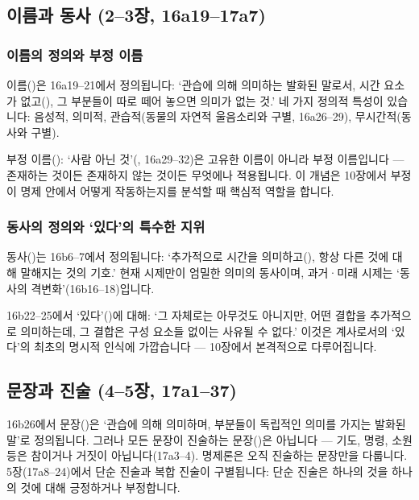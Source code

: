 \documentclass[12pt, a4paper]{article}
\begin{document}
\subsection{이름과 동사 (2--3장, 16a19--17a7)}

\subsubsection{이름의 정의와 부정 이름}

이름()은 16a19--21에서 정의됩니다: `관습에 의해 의미하는 발화된 말로서, 시간 요소가 없고(), 그 부분들이 따로 떼어 놓으면 의미가 없는 것.' 네 가지 정의적 특성이 있습니다: 음성적, 의미적, 관습적(동물의 자연적 울음소리와 구별, 16a26--29), 무시간적(동사와 구별).

부정 이름(): `사람 아닌 것'(, 16a29--32)은 고유한 이름이 아니라 부정 이름입니다 --- 존재하는 것이든 존재하지 않는 것이든 무엇에나 적용됩니다. 이 개념은 10장에서 부정이 명제 안에서 어떻게 작동하는지를 분석할 때 핵심적 역할을 합니다.

\subsubsection{동사의 정의와 `있다'의 특수한 지위}

동사()는 16b6--7에서 정의됩니다: `추가적으로 시간을 의미하고(), 항상 다른 것에 대해 말해지는 것의 기호.'
현재 시제만이 엄밀한 의미의 동사이며, 과거·미래 시제는 `동사의 격변화'(16b16--18)입니다.

16b22--25에서 `있다'()에 대해: `그 자체로는 아무것도 아니지만, 어떤 결합을 추가적으로 의미하는데, 그 결합은 구성 요소들 없이는 사유될 수 없다.' 이것은 계사로서의 `있다'의 최초의 명시적 인식에 가깝습니다 --- 10장에서 본격적으로 다루어집니다.

\subsection{문장과 진술 (4--5장, 17a1--37)}

16b26에서 문장()은 `관습에 의해 의미하며, 부분들이 독립적인 의미를 가지는 발화된 말'로 정의됩니다. 그러나 모든 문장이 진술하는 문장()은 아닙니다 --- 기도, 명령, 소원 등은 참이거나 거짓이 아닙니다(17a3--4). 명제론은 오직 진술하는 문장만을 다룹니다. 5장(17a8--24)에서 단순 진술과 복합 진술이 구별됩니다: 단순 진술은 하나의 것을 하나의 것에 대해 긍정하거나 부정합니다.
\end{document}
